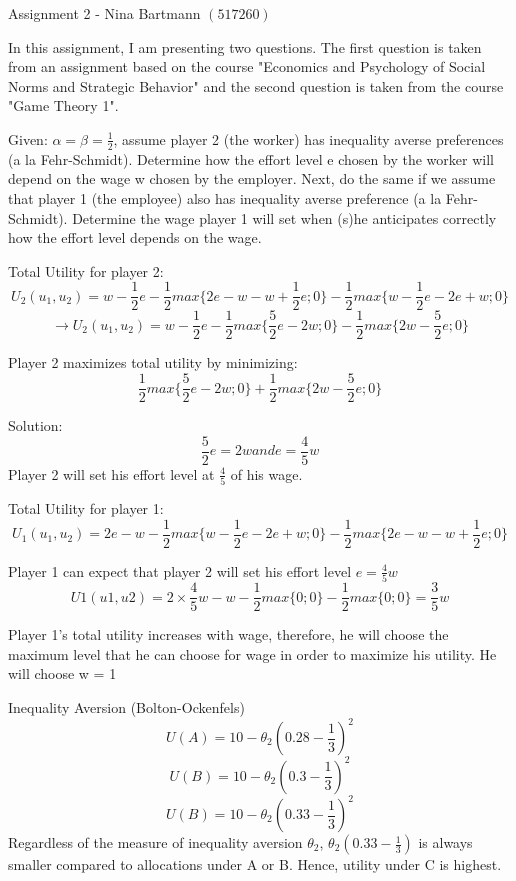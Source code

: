 Assignment 2 - Nina Bartmann $(517260)$

In this assignment, I am presenting two questions. The first question is taken from an assignment based on the course "Economics and Psychology of Social Norms and Strategic Behavior" and the second question is taken from the course "Game Theory 1". 

Given: $\alpha = \beta = \frac{1}{2}$, assume player 2 (the worker) has inequality averse preferences (a la Fehr-Schmidt). Determine how the effort level e chosen by the worker will depend on the wage w chosen by the employer. Next, do the same if we assume that player 1 (the employee) also has inequality averse preference (a la Fehr-Schmidt). Determine the wage player 1 will set when (s)he anticipates correctly how the effort level depends on the wage.

Total Utility for player 2: 
$$U_2(u_1, u_2) = w-\frac{1}{2}e - \frac{1}{2} max\Big\{2e-w-w + \frac{1}{2}e ; 0\Big\}- \frac{1}{2} max\Big\{w-\frac{1}{2}e - 2e+w; 0\Big\}$$
$$\rightarrow U_2(u_1, u_2) = w-\frac{1}{2}e - \frac{1}{2} max\Big\{\frac{5}{2}e-2w ; 0\Big\}- \frac{1}{2} max\Big\{2w-\frac{5}{2}e ; 0\Big\}$$

Player 2 maximizes total utility by minimizing: $$\frac{1}{2} max\Big\{\frac{5}{2}e-2w ; 0\Big\}+ \frac{1}{2} max\Big\{2w -\frac{5}{2}e ; 0\Big\}$$

Solution: $$\frac{5}{2}e = 2w and e = \frac{4}{5}w$$
Player 2 will set his effort level at $\frac{4}{5}$ of his wage. 


Total Utility for player 1: 
$$U_1(u_1, u_2) = 2e - w - \frac{1}{2} max\Big\{w - \frac{1}{2}e -2e+w ; 0\Big\} - \frac{1}{2} max\Big\{2e-w-w +\frac{1}{2}e; 0\Big\}$$

Player 1 can expect that player 2 will set his effort level $e = \frac{4}{5}w$
$$U1(u1, u2) = 2\times\frac{4}{5}w - w - \frac{1}{2} max\Big\{0 ; 0\Big\} - \frac{1}{2} max\Big\{0; 0\Big\} = \frac{3}{5}w$$

Player 1's total utility increases with wage, therefore, he will choose the maximum level that he can choose for wage in order to maximize his utility. He will choose w = 1



Inequality Aversion (Bolton-Ockenfels) 
$$U(A) = 10 - \theta_2(0.28 - \frac{1}{3})^2$$
$$U(B) = 10 - \theta_2(0.3 - \frac{1}{3})^2$$
$$U(B) = 10 - \theta_2(0.33 - \frac{1}{3})^2$$
Regardless of the measure of inequality aversion $\theta_2$, $\theta_2(0.33 - \frac{1}{3})$ is always smaller compared to allocations under A or B. Hence, utility under C is highest. 


